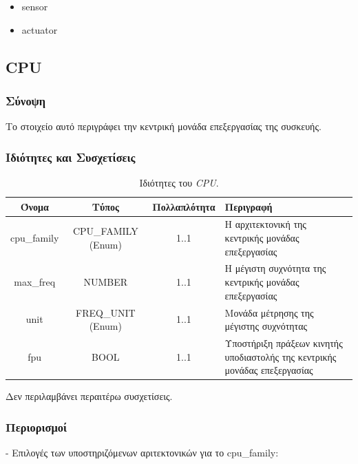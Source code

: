 \begin{itemize}
	\item sensor
	\item actuator
\end{itemize}

\subsection{CPU}
\label{subsec:cpu}

\subsubsection*{Σύνοψη}

\noindent Το στοιχείο αυτό περιγράφει την κεντρική μονάδα επεξεργασίας της συσκευής.

\subsubsection*{Ιδιότητες και Συσχετίσεις}

\begin{table}[H]
	\begin{center}
		\caption{Ιδιότητες του \textit{CPU}.}
		\label{tab:cpu}
		\begin{tabular}{ | c | c | c| m{5.5cm} | }
			\hline
			\rowcolor{Gray}
			Όνομα & Τύπος & Πολλαπλότητα & Περιγραφή \\
			\hline
			cpu\_family & CPU\_FAMILY (Enum) & 1..1 & Η αρχιτεκτονική της κεντρικής μονάδας επεξεργασίας \\
			\hline
			max\_freq & NUMBER & 1..1 & Η μέγιστη συχνότητα της κεντρικής μονάδας επεξεργασίας \\
			\hline
			unit & FREQ\_UNIT (Enum) & 1..1 & Μονάδα μέτρησης της μέγιστης συχνότητας \\
			\hline
			fpu & BOOL & 1..1 & Υποστήριξη πράξεων κινητής υποδιαστολής της κεντρικής μονάδας επεξεργασίας \\
			\hline
		\end{tabular}
	\end{center}
\end{table}

\noindent Δεν περιλαμβάνει περαιτέρω συσχετίσεις.

\subsubsection*{Περιορισμοί}

\noindent - Επιλογές των υποστηριζόμενων αριτεκτονικών για το cpu\_family:

